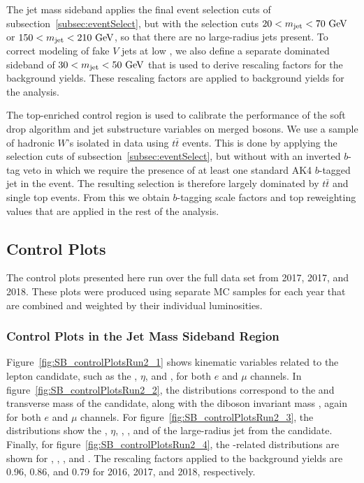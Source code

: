 The jet mass sideband applies the final event selection cuts of subsection~\ref{subsec:eventSelect}, but with the \MJ selection cuts $20<\MJ<70\unit{GeV}$ or $150<\MJ<210\unit{GeV}$, so that there are no \Vhad large-radius jets present.
To correct modeling of fake $V$ jets at low \pt, we also define a separate \Wjets dominated sideband of $30<\MJ<50\unit{GeV}$ that is used to derive rescaling factors for the \Wjets background yields.
These rescaling factors are applied to \Wjets background yields for the analysis.

The top-enriched control region is used to calibrate the performance of the soft drop algorithm and jet substructure variables on merged bosons.
We use a sample of hadronic $W$'s isolated in data using $t\bar{t}$ events.
This is done by applying the selection cuts of subsection~\ref{subsec:eventSelect}, but without with an inverted $b$-tag veto in which we require the presence of at least one standard AK4 $b$-tagged jet in the event.
The resulting selection is therefore largely dominated by $t\bar{t}$ and single top events.
From this we obtain $b$-tagging scale factors and top \pt reweighting values that are applied in the rest of the analysis.

\subsection{Control Plots}

The control plots presented here run over the full data set from 2017, 2017, and 2018.
These plots were produced using separate MC samples for each year that are combined and weighted by their individual luminosities.

\subsubsection{Control Plots in the Jet Mass Sideband Region}

Figure~\ref{fig:SB_controlPlotsRun2_1} shows kinematic variables related to the lepton candidate, such as the \pt, $\eta$, and \Etmiss, for both $e$ and $\mu$ channels.
In figure~\ref{fig:SB_controlPlotsRun2_2}, the distributions correspond to the \pt and transverse mass of the \Wlep candidate, along with the diboson invariant mass \MVV, again for both $e$ and $\mu$ channels.
For figure~\ref{fig:SB_controlPlotsRun2_3}, the distributions show the \pt, $\eta$, \MJ, \nsubjDDT, and \DoubleB of the large-radius jet from the \Vhad candidate.
Finally, for figure~\ref{fig:SB_controlPlotsRun2_4}, the \VBF-related distributions are shown for \DetaVBF, \mjjVBF, \nJets, and \Dy.
The rescaling factors applied to the \Wjets background yields are 0.96, 0.86, and 0.79 for 2016, 2017, and 2018, respectively.

